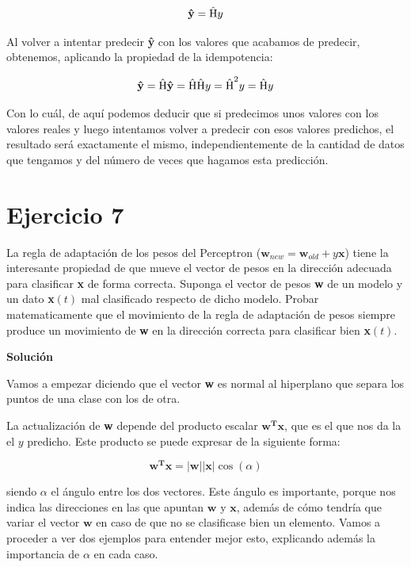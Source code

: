 \documentclass[11pt,a4paper]{article}
\newcommand{\answer}{\noindent\textbf{Solución}}
\begin{document}
\begin{equation}
	\textbf{\text{ŷ}} = \text{Ĥ} y
\end{equation}

Al volver a intentar predecir \textbf{ŷ} con los valores que acabamos de predecir, obtenemos, aplicando la propiedad de
la idempotencia:

\begin{equation}
	\textbf{\text{ŷ}} = \text{Ĥ} \textbf{\text{ŷ}} = \text{Ĥ} \text{Ĥ} y = \text{Ĥ}^2 y = \text{Ĥ} y
\end{equation}

Con lo cuál, de aquí podemos deducir que si predecimos unos valores con los valores reales y luego intentamos volver a
predecir con esos valores predichos, el resultado será exactamente el mismo, independientemente de la cantidad de datos
que tengamos y del número de veces que hagamos esta predicción.

\section*{Ejercicio 7}

\noindent La regla de adaptación de los pesos del Perceptron ($\mathbf{w}_{new} = \mathbf{w}_{old} + y\mathbf{x}$) tiene
la interesante propiedad de que mueve el vector de pesos en la dirección adecuada para clasificar \textbf{x} de forma
correcta. Suponga el vector de pesos \textbf{w} de un modelo y un dato \textbf{x}$(t)$ mal clasificado respecto de dicho
modelo. Probar matematicamente que el movimiento de la regla de adaptación de pesos siempre produce un movimiento de
\textbf{w} en la dirección correcta para clasificar bien \textbf{x}$(t)$.

\answer

Vamos a empezar diciendo que el vector \textbf{w} es normal al hiperplano que separa los puntos de una clase con los de
otra.

La actualización de \textbf{w} depende del producto escalar $\mathbf{w^\textbf{T}\mathbf{x}}$, que es el que nos da la
el $y$ predicho. Este producto se puede expresar de la siguiente forma:

\begin{equation}
\label{eq:dot_product}
	\mathbf{w^\textbf{T}\mathbf{x}} = |\mathbf{w}| |\mathbf{x}| \cos(\alpha)
\end{equation}

\noindent siendo $\alpha$ el ángulo entre los dos vectores. Este ángulo es importante, porque nos indica las direcciones en las que apuntan $\mathbf{w}$ y $\mathbf{x}$, además de cómo tendría que variar el vector $\mathbf{w}$ en caso de que no se
clasificase bien un elemento. Vamos a proceder a ver dos ejemplos para entender mejor esto, explicando además la importancia
de $\alpha$ en cada caso.
\end{document}
